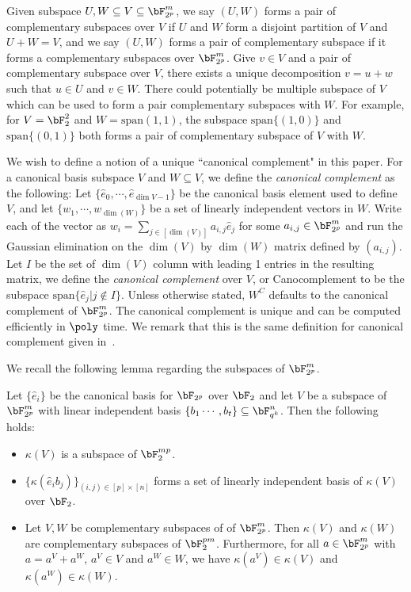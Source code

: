 Given subspace $U,W \subseteq V \subseteq \bF_{2^p}^m$, we say $(U,W)$ forms a pair of complementary subspaces over $V$ if $U$ and $W$ form a disjoint partition of $V$ and $U + W = V$, and we say $(U,W)$ forms a pair of complementary subspace if it forms a complementary subspaces over $\bF_{2^p}^m$. Give $v \in V$ and a pair of complementary subspace over $V$, there exists a unique decomposition $v = u + w$ such that $u \in U$ and $v \in W$. There could potentially be multiple subspace of $V$ which can be used to form a pair complementary subspaces with $W$. For example, for $V  = \bF_{2}^2$ and $W = \text{span}{(1,1)}$, the subspace $\text{span}\{(1,0)\}$ and $ \text{span}\{(0,1)\}$ both forms a pair of complementary subspace of $V$ with $W$. 

We wish to define a notion of a unique ``canonical complement" in this paper. For a canonical basis subspace $V$ and $W \subseteq V$, we define the \textit{canonical complement} as the following: Let $\{\hat{e}_0, \cdots, \hat{e}_{\dim{V}-1} \}$ be the canonical basis element used to define $V$, and let $\{w_1, \cdots , w_{\dim(W)}\}$ be a set of linearly independent vectors in $W$.  Write each of the vector as $w_i = \sum_{j \in [\dim(V)]} a_{i,j} \hat{e}_j$ for some $ a_{i,j} \in \bF_{2^p}^m$ and run the Gaussian elimination on the $\dim(V)$ by $\dim(W)$ matrix defined by $(a_{i,j})$. Let $I$ be the set of $\dim(V)$ column with leading 1 entries in the resulting matrix, we define the \textit{canonical complement} over $V$, or \gls{Canocomplement} to be the subspace $\text{span}\{ \hat{e}_j| j \not\in I\}$. Unless otherwise stated, $W^{C}$ defaults to the canonical complement of $\bF_{2^p}^m$. The canonical complement is unique and can be computed efficiently in $\poly$ time. We remark that this is the same definition for canonical complement given in~\cite[Definition 3.6]{jiMIPRE2022a}. 

We recall the following lemma regarding the subspaces of $\bF_{2^p}^m$. 
\begin{lemma}\label{lem:finitefielddecomp}
	Let $\{\hat{e}_i\}$ be the canonical basis for $\bF_{2^p}$ over $\bF_2$ and let $V$ be a subspace of $\bF_{2^p}^m$ with linear independent basis $\{ b_1 \cdots , b_t\} \subseteq \bF_{q^k}^n$. Then the following holds:
	\begin{itemize}
		\item $\kappa(V)$ is a subspace of $\bF_2^{mp}$.
		\item $\{ \kappa(\hat{e}_i b_j)  \}_{(i,j) \in [p] \times [n] }$ forms a set of linearly independent basis of $\kappa(V)$ over $\bF_2$.
		\item Let $V,W$ be complementary subspaces of of $\bF_{2^p}^m$. Then $\kappa(V)$ and $\kappa(W)$ are complementary subspaces of $\bF_{2}^{pm}$. Furthermore, for all $a \in \bF_{2^p}^m$ with $a = a^V + a^W$, $a^V \in V$ and $a^W \in W$, we have $\kappa(a^V) \in \kappa(V)$ and $\kappa(a^W)\in \kappa(W)$. 
	\end{itemize}
\end{lemma}

